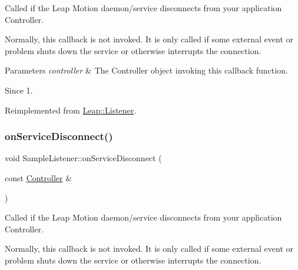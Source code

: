 Called if the Leap Motion daemon/service disconnects from your application Controller.

Normally, this callback is not invoked. It is only called if some external event or problem shuts down the service or otherwise interrupts the connection.


\begin{DoxyCodeInclude}
\end{DoxyCodeInclude}



\begin{DoxyParams}{Parameters}
{\em controller} & The Controller object invoking this callback function. \\
\hline
\end{DoxyParams}
\begin{DoxySince}{Since}
1. 
\end{DoxySince}


Reimplemented from \hyperlink{class_leap_1_1_listener_a894976a7ff7a101a08c9b88a43ec367b}{Leap\+::\+Listener}.

\mbox{\label{class_sample_listener_afb2cf676f82cb7df58052085ecc64dd1}} 
\subsubsection{\texorpdfstring{on\+Service\+Disconnect()}{onServiceDisconnect()}\hspace{0.1cm}{\footnotesize\ttfamily [2/2]}}
{\footnotesize\ttfamily void Sample\+Listener\+::on\+Service\+Disconnect (\begin{DoxyParamCaption}\item[{const \hyperlink{class_leap_1_1_controller}{Controller} \&}]{ }\end{DoxyParamCaption})\hspace{0.3cm}{\ttfamily [virtual]}}

Called if the Leap Motion daemon/service disconnects from your application Controller.

Normally, this callback is not invoked. It is only called if some external event or problem shuts down the service or otherwise interrupts the connection.


\begin{DoxyCodeInclude}
\end{DoxyCodeInclude}



